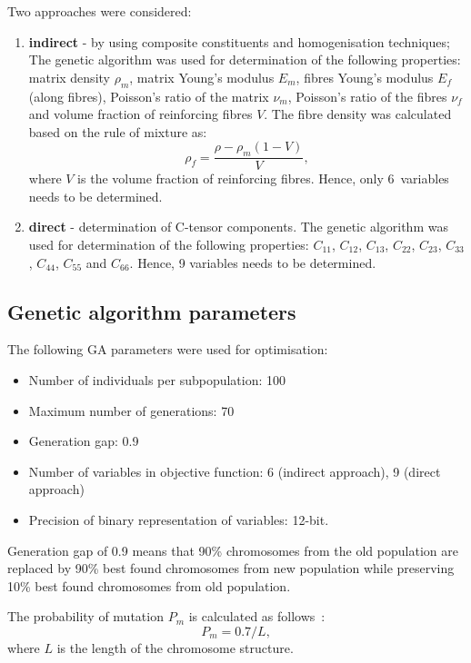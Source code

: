 \documentclass[preprint,12pt]{elsarticle}
\begin{document}
	Two approaches were considered:
	\begin{enumerate}
		\item \textbf{indirect} - by using composite constituents and homogenisation techniques;
		The genetic algorithm was used for determination of the following properties:  matrix density $\rho_m$, matrix Young's modulus $E_m$, fibres Young's modulus $E_f$ (along fibres), Poisson's ratio of the matrix $\nu_m$, Poisson's ratio of the fibres $\nu_f$ and volume fraction of reinforcing fibres $V$.  The fibre density was calculated based on the rule of mixture as:
		\begin{equation}
		\rho_f = \frac{\rho - \rho_m (1-V)}{V},
		\end{equation}
		where $V$ is the volume fraction of reinforcing fibres. Hence, only 6~variables needs to be determined.
		\item \textbf{direct} - determination of C-tensor components.
		The genetic algorithm was used for determination of the following properties: $C_{11}$, $C_{12}$, $C_{13}$,  $C_{22}$, $C_{23}$, $C_{33}$, $C_{44}$, $C_{55}$ and $C_{66}$. Hence, 9 variables needs to be determined.
	\end{enumerate}

	\subsection{Genetic algorithm parameters}
	The following GA parameters were used for optimisation:
	\begin{itemize}
		\item Number of individuals per subpopulation: 100
		\item Maximum number of generations: 70
		\item Generation gap: 0.9
		\item Number of variables in objective function: 6 (indirect approach), 9 (direct approach)
		\item Precision of binary representation of variables: 12-bit.
   \end{itemize}
    Generation gap of 0.9 means that 90\% chromosomes from the old population are replaced by 90\% best found chromosomes from new population while preserving 10\% best found chromosomes from old population.
    
    The probability of mutation $P_m$ is calculated as follows~\cite{Chipperfield1994}:
    \begin{equation}
    	P_m = 0.7/L,
    \end{equation}
    where $L$ is the length of the chromosome structure.
    
\end{document}
